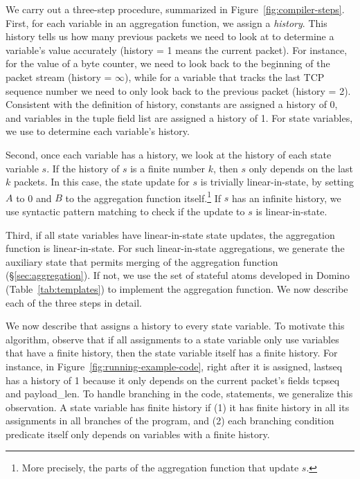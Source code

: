 We carry out a three-step procedure, summarized in
Figure~\ref{fig:compiler-steps}.  First, for each variable in an aggregation
function, we assign a {\em history}.  This history tells us how many previous
packets we need to look at to determine a variable's value accurately (history
= 1 means the current packet). For instance, for the value of a byte counter,
we need to look back to the beginning of the packet stream (history =
$\infty$), while for a variable that tracks the last TCP sequence number we
need to only look back to the previous packet (history = 2). Consistent with
the definition of history, constants are assigned a history of 0, and variables
in the tuple field list are assigned a history of 1. For state variables, we
use  to determine each variable's history.

Second, once each variable has a history, we look at the history of each state
variable $s$. If the history of $s$ is a finite number $k$, then $s$ only
depends on the last $k$ packets. In this case, the state update for $s$ is
trivially linear-in-state, by setting $A$ to 0 and $B$ to the aggregation
function itself.\footnote{More precisely, the parts of the aggregation function
that update $s$.} If $s$ has an infinite history, we use syntactic pattern
matching to check if the update to $s$ is linear-in-state.

Third, if all state variables have linear-in-state state updates, the
aggregation function is linear-in-state. For such linear-in-state aggregations,
we generate the auxiliary state that permits merging of the aggregation
function (\S\ref{sec:aggregation}). If not, we use the set of stateful atoms
developed in Domino (Table~\ref{tab:templates}) to implement the aggregation
function. We now describe each of the three steps in detail.

 We now describe 
that assigns a history to every state variable. To motivate this algorithm,
observe that if all assignments to a state variable only use variables that
have a finite history, then the state variable itself has a finite history. For
instance, in Figure~\ref{fig:running-example-code}, right after it is assigned,
{\ct lastseq} has a history of 1 because it only depends on the current
packet's fields {\ct tcpseq} and {\ct payload\_len}. To handle branching in the
code,  statements, we generalize this
observation. A state variable has finite history if  (1) it has finite history
in all its assignments in all branches of the program, and (2) each branching
condition {\ct predicate} itself only depends on variables with a finite
history.

